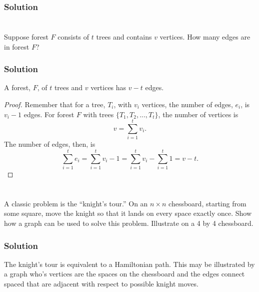 \documentclass{amsart}
\begin{document}
\subsubsection*{Solution}

\section{}
Suppose forest $F$ consists of $t$ trees and contains $v$ vertices. How many
edges are in forest $F$?

\subsubsection*{Solution}

A forest, $F$, of $t$ trees and $v$ vertices has $v-t$ edges.
\begin{proof}
  Remember that for a tree, $T_i$, with $v_i$ vertices, the number of edges,
  $e_i$, is $v_i - 1$ edges.
  For forest $F$ with trees $\{T_1, T_2,...,T_t\}$, the number of vertices is
  \begin{equation}
    v = \sum_{i=1}^t v_i.
  \end{equation}
  The number of edges, then, is
  \begin{equation}
    \sum_{i=1}^t e_i = \sum_{i=1}^t v_i -1 = \sum_{i=1}^t v_i - \sum_{i=1}^t  1 = v - t.
  \end{equation}
\end{proof}

\section{} %
A classic problem is the ``knight's tour.''
On an $n \times n$ chessboard, starting from some
square, move the knight so that it lands on every space exactly once.
Show how a graph can be used to solve this problem.
Illustrate on a 4 by 4 chessboard.

\subsubsection*{Solution}
The knight's tour is equivalent to a Hamiltonian path. This may be illustrated
by a graph who's vertices are the spaces on the chessboard and the edges connect
spaced that are adjacent with respect to possible knight moves.
\end{document}
